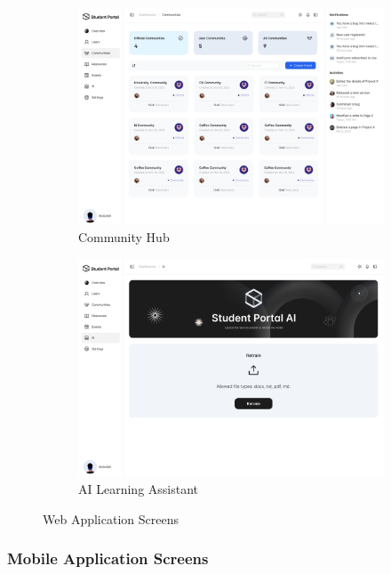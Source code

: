 \begin{figure}[h]
\begin{subfigure}[b]{0.45\textwidth}
        \centering
        \includegraphics[width=\textwidth]{images/front_end_screens/dashboard-community-managment.png}
        \caption{Community Hub}
        \label{fig:web-community}
    \end{subfigure}
    \hfill
    \begin{subfigure}[b]{0.45\textwidth}
        \centering
        \includegraphics[width=\textwidth]{images/front_end_screens/dashboard-ai-training.png}
        \caption{AI Learning Assistant}
        \label{fig:web-ai}
    \end{subfigure}
    \caption{Web Application Screens}
    \label{fig:web_screens}
\end{figure}

\subsubsection{Mobile Application Screens}
\label{subsubsec:mobile_screens}

